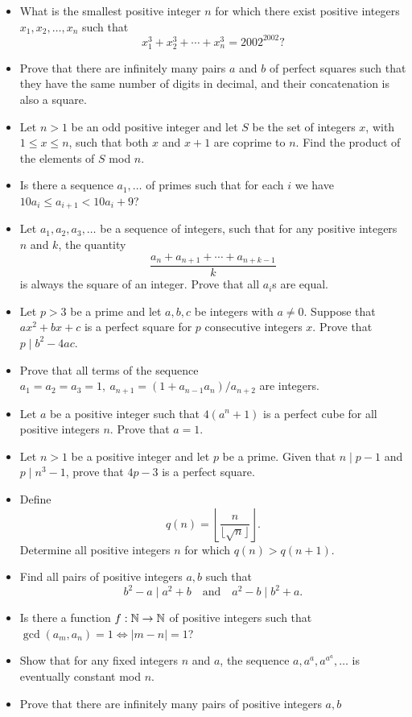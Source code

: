 \begin{itemize}
  \item What is the smallest positive integer $n$ for which there exist positive
    integers $x_1,x_2,\ldots,x_n$ such that
    \[x_1^3+x_2^3+\cdots+x_n^3=2002^{2002}?\]
  \item Prove that there are infinitely many pairs $a$ and $b$ of perfect
    squares such that they have the same number of digits in decimal, and their
    concatenation is also a square.
  \item Let $n>1$ be an odd positive integer and let $S$ be the set of integers
    $x$, with $1\le x\le n$, such that both $x$ and $x+1$ are coprime to $n$.
    Find the product of the elements of $S$ mod $n$.
  \item Is there a sequence $a_1,\ldots$ of primes such that for each $i$ we
    have $10 a_i\le a_{i+1}<10a_i+9$?
  \item Let $a_1,a_2,a_3,\ldots$ be a sequence of integers, such that for any
    positive integers $n$ and $k$, the quantity
    \[\frac{a_n+a_{n+1}+\cdots+a_{n+k-1}}k\]
    is always the square of an integer. Prove that all $a_i$s are equal.
  \item Let $p>3$ be a prime and let $a,b,c$ be integers with $a\ne 0$. Suppose
    that $ax^2+bx+c$ is a perfect square for $p$ consecutive integers $x$. Prove
    that $p\mid b^2-4ac$.
  \item Prove that all terms of the sequence $a_1=a_2=a_3=1,\
    a_{n+1}=(1+a_{n-1}a_n)/a_{n+2}$ are integers.
    \item Let $a$ be a positive integer such that $4(a^n+1)$ is a perfect
      cube for all positive integers $n$. Prove that $a=1$.
  \item Let $n>1$ be a positive integer and let $p$ be a prime. Given that
    $n\mid p-1$ and $p\mid n^3-1$, prove that $4p-3$ is a perfect square.
  \item Define
    \[q(n)=\left\lfloor\frac n{\lfloor\sqrt n\rfloor}\right\rfloor.\]
    Determine all positive integers $n$ for which $q(n)>q(n+1)$.
    \item Find all pairs of positive integers $a,b$ such that \[b^2-a\mid
        a^2+b\quad\text{and}\quad a^2-b\mid b^2+a.\]
  \item Is there a function $f:\mathbb{N}\to\mathbb{N}$ of positive integers such that
    $\gcd(a_m,a_n)=1\iff |m-n|=1$?
  \item Show that for any fixed integers $n$ and $a$, the sequence
    $a,a^a,a^{a^a},\ldots$ is eventually constant mod $n$.
  \item Prove that there are infinitely many pairs of positive integers $a,b$

\end{itemize}

